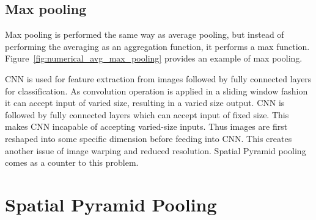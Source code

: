 \subsection{Max pooling}
Max pooling \cite{krizhevsky2012imagenet} is performed the same way as average pooling, but instead of performing the averaging as an aggregation function, it performs a max function. Figure~\ref{fig:numerical_avg_max_pooling} provides an example of max pooling.


CNN is used for feature extraction from images followed by fully connected layers for classification. As convolution operation is applied in a sliding window fashion it can accept input of varied size, resulting in a varied size output. CNN is followed by fully connected layers which can accept input of fixed size. This makes CNN incapable of accepting varied-size inputs. Thus images are first reshaped into some specific dimension before feeding into CNN. This creates another issue of image warping and reduced resolution. Spatial Pyramid pooling comes as a counter to this problem.

\section{Spatial Pyramid Pooling}

